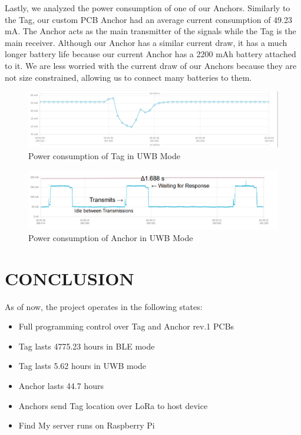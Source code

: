 \documentclass[conference]{IEEEtran}
\begin{document}
Lastly, we analyzed the power consumption of one of our Anchors. 
Similarly to the Tag, our custom PCB Anchor had an average current 
consumption of 49.23 mA. The Anchor acts as the main transmitter of the 
signals while the Tag is the main receiver. Although our Anchor has a 
similar current draw, it has a much longer battery life because our 
current Anchor has a 2200 mAh battery attached to it. We are less worried 
with the current draw of our Anchors because they are not size constrained, 
allowing us to connect many batteries to them. 


\begin{figure}
\begin{center}
\includegraphics[scale=0.45]{mdr_uwb_tag_power_consumption.png}
\caption{Power consumption of Tag in UWB Mode}
\end{center}
\end{figure}

\begin{figure}
\begin{center}
\includegraphics[scale=0.45]{mdr_uwb_anchor_power_consumption.png}
\caption{Power consumption of Anchor in UWB Mode}
\end{center}
\end{figure}

\section{CONCLUSION}
As of now, the project operates in the following states:
\begin{itemize}
    \item Full programming control over Tag and Anchor rev.1 PCBs
    \item Tag lasts 4775.23 hours in BLE mode
    \item Tag lasts 5.62 hours in UWB mode
    \item Anchor lasts 44.7 hours
    \item Anchors send Tag location over LoRa to host device
    \item Find My server runs on Raspberry Pi
\end{itemize}
\end{document}
